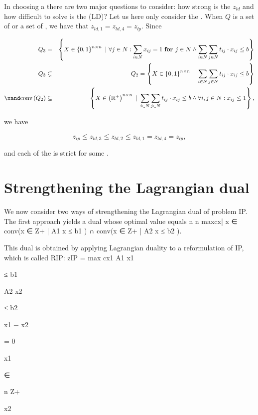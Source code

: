 In choosing a  there are two major questions to consider: how strong is the  $z_{ld}$ and how difficult to solve is the  (LD)? Let us here only consider the . When $Q$ is a set of  or a set of , we have that $z_{ld,1}=z_{ld,4}=z_{lp}$. Since

\begin{eqnarray}
Q_3&=&\condset{X\in\accl{0,1}^{n\times n}}{\forall j\in N:\sumdomain[i]{N}{x_{ij}}=1\xfor j\in N\wedge\sumdomain[i]{N}{\sumdomain[j]{N}{t_{ij}\cdot x_{ij}}}\leq b}\\
Q_3&\subsetneq&Q_2=\condset{X\in\accl{0,1}^{n\times n}}{\sumdomain[i]{N}{\sumdomain[j]{N}{t_{ij}\cdot x_{ij}}}\leq b}\\
\xand\funm{conv}{Q_2}&\subsetneq&\condset{X\in\brak{\RRR^+}^{n\times n}}{\sumdomain[i]{N}{\sumdomain[j]{N}{t_{ij}\cdot x_{ij}}}\leq b\wedge\forall i,j\in N:x_{ij}\leq 1},
\end{eqnarray}

we have

\begin{equation}
z_{ip}\leq z_{ld,3}\leq z_{ld,2}\leq z_{ld,1}=z_{ld,4}=z_{lp},
\end{equation}

and each of the  is strict for some .

\section{Strengthening the Lagrangian dual}

We now consider two ways of strengthening the Lagrangian dual of problem IP. The first approach yields
a dual whose optimal value equals
n
n
max{cx| x ∈ conv(x ∈ Z+
| A1 x ≤ b1 ) ∩ conv(x ∈ Z+
| A2 x ≤ b2 )}.

This dual is obtained by applying Lagrangian duality to a reformulation of IP, which is called RIP:
zIP = max cx1
A1 x1

≤ b1

A2 x2

≤ b2

x1 − x2

= 0

x1

∈

n
Z+

x2

